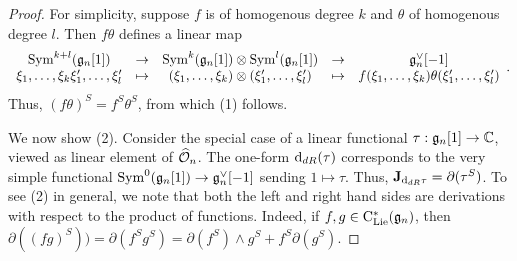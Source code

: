 \begin{proof}
For simplicity, suppose $f$ is of homogenous degree $k$ and $\theta$ of homogenous degree $l$.  
Then $f \theta$ defines a linear map 
\[
\begin{array}{ccccc}
{\rm Sym}^{k+l}(\mathfrak g_n[1]) & \to & {\rm Sym}^{k}(\mathfrak g_n[1]) \otimes {\rm Sym}^l(\mathfrak g_n[1]) & \to & \mathfrak g_n^\vee[-1]\\
\xi_1,\ldots,\xi_k \xi_1',\ldots,\xi_l' & \mapsto & (\xi_1,\ldots,\xi_k) \otimes (\xi_1',\ldots,\xi_l') & \mapsto & f(\xi_1,\ldots,\xi_k) \theta(\xi_1',\ldots,\xi_l')
\end{array}.
\]
Thus, $(f \theta)^S = f^S \theta^S$, from which (1) follows.

We now show (2). Consider the special case of a linear functional $\tau : \mathfrak{g}_n[1] \to \mathbb C$, viewed as linear element of $\widehat{\mathcal O}_n$.
The one-form ${\rm d}_{dR}(\tau)$ corresponds to the very simple functional ${\rm Sym}^0(\mathfrak{g}_n[1]) \to \mathfrak g_n^\vee[-1]$ sending $1 \mapsto \tau$. 
Thus, $\mathbf{J}_{{\rm d}_{dR} \tau} = \partial(\tau^S)$. 
To see (2) in general, we note that both the left and right hand sides are derivations with respect to the product of functions. 
Indeed, if $f,g \in {\rm C}_{{\rm Lie}}^*(\mathfrak{g}_n)$, then $\partial((fg)^S)) = \partial(f^S g^S) = \partial(f^S)\wedge g^S + f^S \partial(g^S)$. 
\end{proof}

